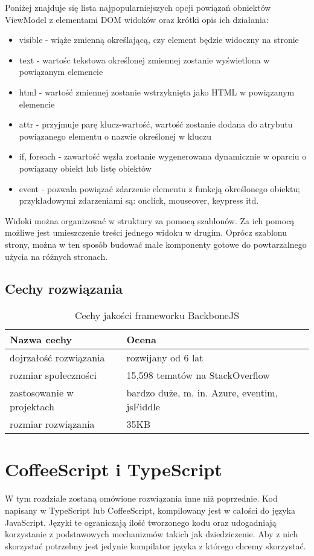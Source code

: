 Poniżej znajduje się lista najpopularniejszych opcji powiązań obniektów ViewModel z elementami DOM widoków oraz krótki opis ich działania:

\begin{itemize}
\item visible - wiąże zmienną określającą, czy element będzie widoczny na stronie
\item text - wartośc tekstowa określonej zmiennej zostanie wyświetlona w powiązanym elemencie
\item html - wartość zmiennej zostanie wstrzyknięta jako HTML w powiązanym elemencie
\item attr - przyjmuje parę klucz-wartość, wartość zostanie dodana do atrybutu powiązanego elementu o nazwie określonej w kluczu
\item if, foreach - zawartość węzła zostanie wygenerowana dynamicznie w oparciu o powiązany obiekt lub listę obiektów
\item event - pozwala powiązać zdarzenie elementu z funkcją określonego obiektu; przykładowymi zdarzeniami są: onclick, mouseover, keypress itd.
\end{itemize}

Widoki można organizować w struktury za pomocą szablonów. Za ich pomocą możliwe jest umieszczenie treści jednego widoku w drugim. Oprócz szablonu strony, można w ten sposób budować małe komponenty gotowe do powtarzalnego użycia na różnych stronach.

\subsection{Cechy rozwiązania}
\begin{table}[h]
	\caption{Cechy jakości frameworku BackboneJS}
	\label{tab:heading-styles}
	\begin{tabularx}{\textwidth}{|X|X|}
		\hline
		Nazwa cechy							& Ocena 	\\ 
		\hline
		dojrzałość rozwiązania 				& rozwijany od 6 lat 	\\ 
		\hline
		rozmiar społeczności				& 15,598 tematów na StackOverflow \\ 
		\hline
		zastosowanie w projektach			& bardzo duże, m. in. Azure, eventim, jsFiddle \\
		\hline
		rozmiar rozwiązania					& 35KB  \\
		\hline
	\end{tabularx}
\end{table}


\section{CoffeeScript i TypeScript}
W tym rozdziale zostaną omówione rozwiązania inne niż poprzednie. Kod napisany w TypeScript lub CoffeeScript, kompilowany jest w całości do języka JavaScript\cite{typescript-book,}. Języki te ograniczają ilość tworzonego kodu oraz udogadniają korzystanie z podstawowych mechanizmów takich jak dziedziczenie. Aby z nich skorzystać potrzebny jest jedynie kompilator języka z którego chcemy skorzystać. 


